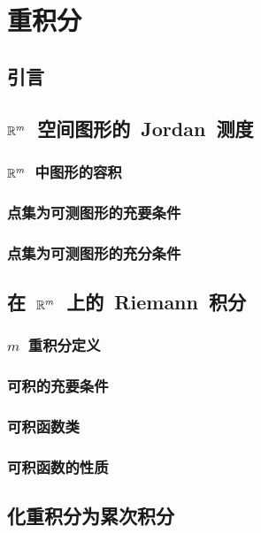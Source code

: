 

\chapter{重积分}\label{ch:20}
\section{引\emspace 言}
\section{$\mathbb{R}^m$~空间图形的~Jordan~测度}
\subsection{$\mathbb{R}^m$~中图形的容积}
\subsection{点集为可测图形的充要条件}
\subsection{点集为可测图形的充分条件}
\begin{exercise}

\end{exercise}
\section{在~$\mathbb{R}^m$~上的~Riemann~积分}
\subsection{$m$~重积分定义}
\subsection{可积的充要条件}
\subsection{可积函数类}
\subsection{可积函数的性质}
\begin{exercise}

\end{exercise}
\section{化重积分为累次积分}
